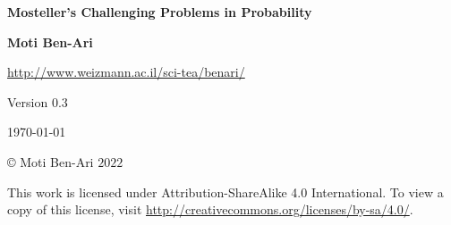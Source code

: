 

\thispagestyle{empty}

\begin{center}
\textbf{\LARGE Mosteller's Challenging Problems in Probability}

\bigskip
\bigskip
\bigskip

\textbf{\Large Moti Ben-Ari}

\bigskip

\url{http://www.weizmann.ac.il/sci-tea/benari/}

\bigskip
\bigskip
\bigskip

Version $0.3$

\bigskip

\today

\end{center}

\vfill

\begin{center}
\copyright{} Moti Ben-Ari $2022$
 \end{center}
 
\begin{small}
This work is licensed under Attribution-ShareAlike 4.0 International. To view a copy of this license, visit \url{http://creativecommons.org/licenses/by-sa/4.0/}.

%
%
%
%
%
%
\end{small}
\newpage

\tableofcontents

\newpage

